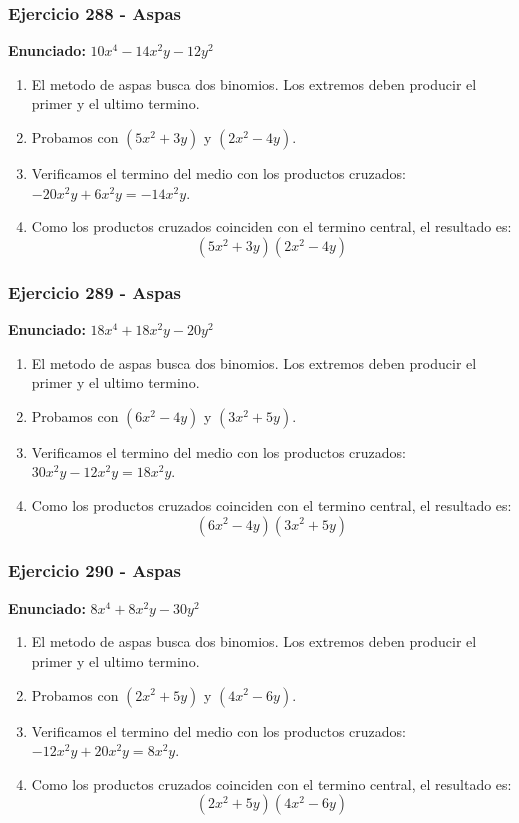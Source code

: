\documentclass[11pt,a4paper]{article}
\begin{document}
\vspace{0.2cm}
\subsubsection*{Ejercicio 288 - Aspas}
\textbf{Enunciado:} $ 10 x^{4} - 14 x^{2} y - 12 y^{2} $\par
\begin{enumerate}[leftmargin=2em]
\item El metodo de aspas busca dos binomios. Los extremos deben producir el primer y el ultimo termino.
\item Probamos con \((5 x^{2} + 3 y)\) y \((2 x^{2} - 4 y)\).
\item Verificamos el termino del medio con los productos cruzados: \(- 20 x^{2} y+6 x^{2} y=- 14 x^{2} y\).
\item Como los productos cruzados coinciden con el termino central, el resultado es: \[\boxed{\left(5 x^{2} + 3 y\right)\left(2 x^{2} - 4 y\right)}\]
\end{enumerate}

\vspace{0.2cm}
\subsubsection*{Ejercicio 289 - Aspas}
\textbf{Enunciado:} $ 18 x^{4} + 18 x^{2} y - 20 y^{2} $\par
\begin{enumerate}[leftmargin=2em]
\item El metodo de aspas busca dos binomios. Los extremos deben producir el primer y el ultimo termino.
\item Probamos con \((6 x^{2} - 4 y)\) y \((3 x^{2} + 5 y)\).
\item Verificamos el termino del medio con los productos cruzados: \(30 x^{2} y- 12 x^{2} y=18 x^{2} y\).
\item Como los productos cruzados coinciden con el termino central, el resultado es: \[\boxed{\left(6 x^{2} - 4 y\right)\left(3 x^{2} + 5 y\right)}\]
\end{enumerate}

\vspace{0.2cm}
\subsubsection*{Ejercicio 290 - Aspas}
\textbf{Enunciado:} $ 8 x^{4} + 8 x^{2} y - 30 y^{2} $\par
\begin{enumerate}[leftmargin=2em]
\item El metodo de aspas busca dos binomios. Los extremos deben producir el primer y el ultimo termino.
\item Probamos con \((2 x^{2} + 5 y)\) y \((4 x^{2} - 6 y)\).
\item Verificamos el termino del medio con los productos cruzados: \(- 12 x^{2} y+20 x^{2} y=8 x^{2} y\).
\item Como los productos cruzados coinciden con el termino central, el resultado es: \[\boxed{\left(2 x^{2} + 5 y\right)\left(4 x^{2} - 6 y\right)}\]
\end{enumerate}
\end{document}
